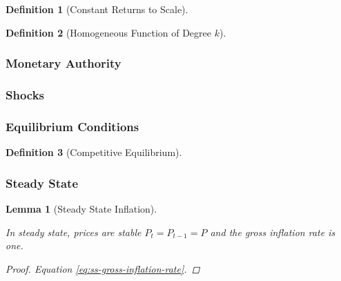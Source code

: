 \documentclass[
	12pt, 
	]{article}
\numberwithin{equation}{section}
\theoremstyle{definition}
\newtheorem{definition}{Definition}[section]
\theoremstyle{plain}
\theoremstyle{plain}
\newtheorem{lemma}{Lemma}[section]
\theoremstyle{plain}
\begin{document}

\begin{definition}[Constant Returns to Scale]
	\cite[Lecture 1, p.5]{solis-garcia_ucb_2022}
\end{definition}

\begin{definition}[Homogeneous Function of Degree $k$]
	\cite[Lecture 1, p.5]{solis-garcia_ucb_2022}
\end{definition}

\subsubsection{Monetary Authority}

\subsubsection{Shocks}

\subsubsection{Equilibrium Conditions}

\begin{definition}[Competitive Equilibrium]
	\cite[Lecture 1, p.6]{solis-garcia_ucb_2022}
\end{definition}


\subsubsection{Steady State}


\begin{lemma}[Steady State Inflation]\label{lemma:steady-state-inflation}
	
	In steady state, prices are stable $P_t = P_{t-1} = P$ and the gross inflation rate is one.
	\begin{proof} Equation \ref{eq:ss-gross-inflation-rate}. \end{proof}  \end{lemma}
\end{document}
